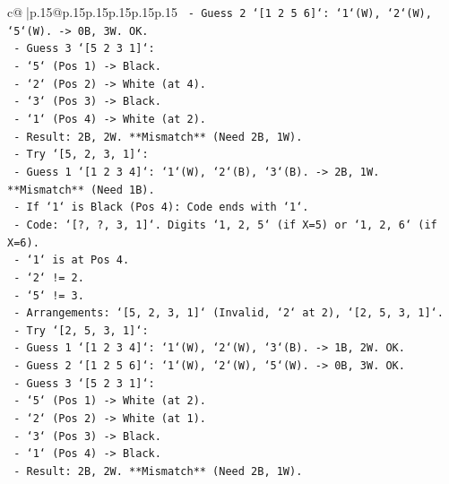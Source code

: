 \documentclass{article}
\begin{document}
{\begin{supertabular}{c@{$\;$}|p{.15\linewidth}@{}p{.15\linewidth}p{.15\linewidth}p{.15\linewidth}p{.15\linewidth}p{.15\linewidth}}
{{{\texttt{                {-} Guess 2 `{[}1 2 5 6{]}`: `1`(W), `2`(W), `5`(W). {-}> 0B, 3W. OK.} \\
\texttt{                {-} Guess 3 `{[}5 2 3 1{]}`:} \\
\texttt{                    {-} `5` (Pos 1) {-}> Black.} \\
\texttt{                    {-} `2` (Pos 2) {-}> White (at 4).} \\
\texttt{                    {-} `3` (Pos 3) {-}> Black.} \\
\texttt{                    {-} `1` (Pos 4) {-}> White (at 2).} \\
\texttt{                    {-} Result: 2B, 2W. **Mismatch** (Need 2B, 1W).} \\
\texttt{            {-} Try `{[}5, 2, 3, 1{]}`:} \\
\texttt{                {-} Guess 1 `{[}1 2 3 4{]}`: `1`(W), `2`(B), `3`(B). {-}> 2B, 1W. **Mismatch** (Need 1B).} \\
\texttt{        {-} If `1` is Black (Pos 4): Code ends with `1`.} \\
\texttt{            {-} Code: `{[}?, ?, 3, 1{]}`. Digits `1, 2, 5` (if X=5) or `1, 2, 6` (if X=6).} \\
\texttt{            {-} `1` is at Pos 4.} \\
\texttt{            {-} `2` != 2.} \\
\texttt{            {-} `5` != 3.} \\
\texttt{            {-} Arrangements: `{[}5, 2, 3, 1{]}` (Invalid, `2` at 2), `{[}2, 5, 3, 1{]}`.} \\
\texttt{            {-} Try `{[}2, 5, 3, 1{]}`:} \\
\texttt{                {-} Guess 1 `{[}1 2 3 4{]}`: `1`(W), `2`(W), `3`(B). {-}> 1B, 2W. OK.} \\
\texttt{                {-} Guess 2 `{[}1 2 5 6{]}`: `1`(W), `2`(W), `5`(W). {-}> 0B, 3W. OK.} \\
\texttt{                {-} Guess 3 `{[}5 2 3 1{]}`:} \\
\texttt{                    {-} `5` (Pos 1) {-}> White (at 2).} \\
\texttt{                    {-} `2` (Pos 2) {-}> White (at 1).} \\
\texttt{                    {-} `3` (Pos 3) {-}> Black.} \\
\texttt{                    {-} `1` (Pos 4) {-}> Black.} \\
\texttt{                    {-} Result: 2B, 2W. **Mismatch** (Need 2B, 1W).} \\
}}}
\end{supertabular}}
\end{document}

